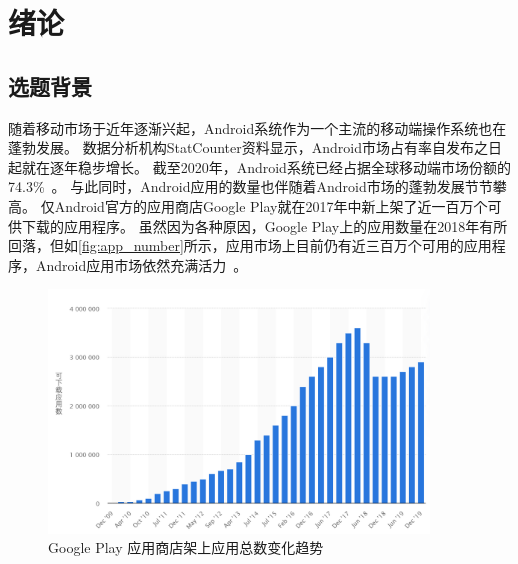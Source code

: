 \chapter {绪论}
\label{chp:intro}

\section{选题背景}

随着移动市场于近年逐渐兴起，Android系统作为一个主流的移动端操作系统也在蓬勃发展。
数据分析机构StatCounter资料显示，Android市场占有率自发布之日起就在逐年稳步增长。
截至2020年，Android系统已经占据全球移动端市场份额的74.3\%~\cite{MobileOSMktShare}。
与此同时，Android应用的数量也伴随着Android市场的蓬勃发展节节攀高。
仅Android官方的应用商店Google Play就在2017年中新上架了近一百万个可供下载的应用程序。
虽然因为各种原因，Google Play上的应用数量在2018年有所回落，但如\autoref{fig:app_number}所示，应用市场上目前仍有近三百万个可用的应用程序，Android应用市场依然充满活力~\cite{StatistaAppNumber}。

\begin{figure}[htbp]
	\centering
	\includegraphics[width=0.9\textwidth]{./Figures/edwin-intro-app-number.png}
	\caption{Google Play 应用商店架上应用总数变化趋势}
	\label{fig:app_number}
\end{figure}


